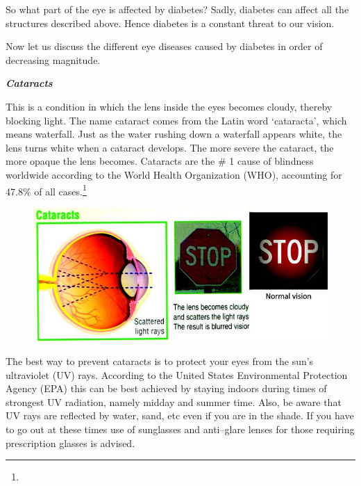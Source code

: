{So what part of the eye is affected by diabetes? Sadly, diabetes can affect all the structures described above. Hence diabetes is a constant threat to our vision.


Now let us discuss the different eye diseases caused by diabetes in order of decreasing magnitude.

\textbf{\textit{Cataracts}}

This is a condition in which the lens inside the eyes becomes cloudy, thereby blocking light. The name cataract comes from the Latin word ‘cataracta’, which means waterfall. Just as the water rushing down a waterfall appears white, the lens turns white when a cataract develops. The more severe the cataract, the more opaque the lens becomes. Cataracts are the \# 1 cause of blindness worldwide according to the World Health Organization (WHO), accounting for 47.8\% of all cases.\footnote{}

\begin{figure}
\includegraphics{images/050.jpg}
\end{figure}


The best way to prevent cataracts is to protect your eyes from the sun’s ultraviolet (UV) rays. According to the United States Environmental Protection Agency (EPA) this can be best achieved by staying indoors during times of strongest UV radiation, namely midday and summer time. Also, be aware that UV rays are reflected by water, sand, etc even if you are in the shade. If you have to go out at these times use of sunglasses and anti–glare lenses for those requiring prescription glasses is advised.

}
